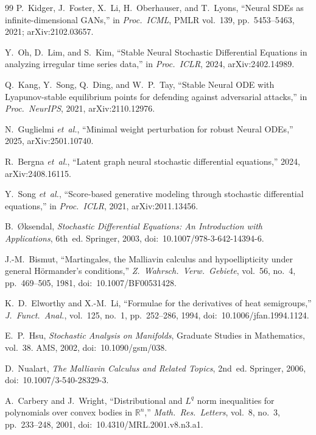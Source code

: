 \documentclass[journal,10pt]{IEEEtran}
\theoremstyle{definition}
\theoremstyle{remark}
\begin{document}
\begin{thebibliography}{99}
 P.~Kidger, J.~Foster, X.~Li, H.~Oberhauser,
and T.~Lyons, ``Neural SDEs as infinite-dimensional GANs,''
in \emph{Proc.\ ICML}, PMLR vol.~139, pp.~5453--5463, 2021;
arXiv:2102.03657.

 Y.~Oh, D.~Lim, and S.~Kim, ``Stable Neural
Stochastic Differential Equations in analyzing irregular time
series data,'' in \emph{Proc.\ ICLR}, 2024, arXiv:2402.14989.

 Q.~Kang, Y.~Song, Q.~Ding, and W.~P.~Tay,
``Stable Neural ODE with Lyapunov-stable equilibrium points for
defending against adversarial attacks,'' in \emph{Proc.\ NeurIPS}, 2021,
arXiv:2110.12976.

 N.~Guglielmi \textit{et~al.},
``Minimal weight perturbation for robust Neural ODEs,'' 2025,
arXiv:2501.10740.

 R.~Bergna \textit{et~al.},
``Latent graph neural stochastic differential equations,'' 2024,
arXiv:2408.16115.

 Y.~Song \textit{et~al.}, ``Score-based
generative modeling through stochastic differential equations,''
in \emph{Proc.\ ICLR}, 2021, arXiv:2011.13456.

 B.~\O{}ksendal, \emph{Stochastic Differential
Equations: An Introduction with Applications}, 6th~ed. Springer, 2003,
doi:~10.1007/978-3-642-14394-6.

 J.-M.~Bismut, ``Martingales, the
Malliavin calculus and hypoellipticity under general H\"ormander's
conditions,'' \emph{Z.\ Wahrsch.\ Verw.\ Gebiete}, vol.~56, no.~4,
pp.~469--505, 1981, doi:~10.1007/BF00531428.

 K.~D.~Elworthy and X.-M.~Li,
``Formulae for the derivatives of heat semigroups,''
\emph{J.\ Funct.\ Anal.}, vol.~125, no.~1, pp.~252--286, 1994,
doi:~10.1006/jfan.1994.1124.

 E.~P.~Hsu, \emph{Stochastic Analysis on Manifolds},
Graduate Studies in Mathematics, vol.~38. AMS, 2002,
doi:~10.1090/gsm/038.

 D.~Nualart, \emph{The Malliavin
Calculus and Related Topics}, 2nd~ed. Springer, 2006,
doi:~10.1007/3-540-28329-3.

 A.~Carbery and J.~Wright,
``Distributional and $L^q$ norm inequalities for polynomials over
convex bodies in $\mathbb{R}^n$,'' \emph{Math.\ Res.\ Letters},
vol.~8, no.~3, pp.~233--248, 2001, doi:~10.4310/MRL.2001.v8.n3.a1.


\end{thebibliography}
\end{document}

